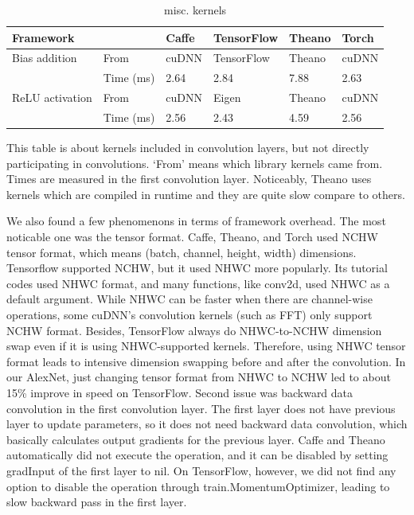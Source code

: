 \begin{table}[]
\centering
\caption{misc. kernels}
\label{table_misc_kernel}
\begin{tabular}{llllll}
\multicolumn{2}{l}{Framework} & Caffe & TensorFlow & Theano & Torch \\ \hline
Bias addition    & From       & cuDNN & TensorFlow & Theano & cuDNN \\
                 & Time (ms)  & 2.64  & 2.84       & 7.88   & 2.63  \\
ReLU activation  & From       & cuDNN & Eigen      & Theano & cuDNN \\
                 & Time (ms)  & 2.56  & 2.43       & 4.59   & 2.56 
\end{tabular}
This table is about kernels included in convolution layers, but not directly participating in convolutions.
`From' means which library kernels came from.
Times are measured in the first convolution layer.
Noticeably, Theano uses kernels which are compiled in runtime and they are quite slow compare to others.
\end{table}

We also found a few phenomenons in terms of framework overhead.
The most noticable one was the tensor format.
Caffe, Theano, and Torch used NCHW tensor format, which means (batch, channel, height, width) dimensions.
Tensorflow supported NCHW, but it used NHWC more popularly.
Its tutorial codes used NHWC format, and many functions, like conv2d, used NHWC as a default argument.
While NHWC can be faster when there are channel-wise operations, some cuDNN's convolution kernels (such as FFT) only support NCHW format.
Besides, TensorFlow always do NHWC-to-NCHW dimension swap even if it is using NHWC-supported kernels.
Therefore, using NHWC tensor format leads to intensive dimension swapping before and after the convolution.
In our AlexNet, just changing tensor format from NHWC to NCHW led to about 15\% improve in speed on TensorFlow.
Second issue was backward data convolution in the first convolution layer.
The first layer does not have previous layer to update parameters, so it does not need backward data convolution, which basically calculates output gradients for the previous layer.
Caffe and Theano automatically did not execute the operation, and it can be disabled by setting gradInput of the first layer to nil.
On TensorFlow, however, we did not find any option to disable the operation through train.MomentumOptimizer, leading to slow backward pass in the first layer.


